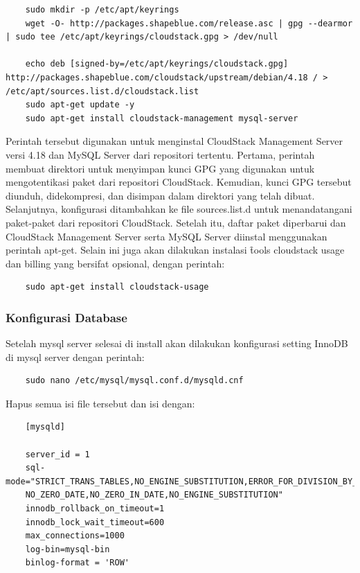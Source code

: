 \begin{listing}[H]
    \begin{verbatim}
    sudo mkdir -p /etc/apt/keyrings
    wget -O- http://packages.shapeblue.com/release.asc | gpg --dearmor | sudo tee /etc/apt/keyrings/cloudstack.gpg > /dev/null

    echo deb [signed-by=/etc/apt/keyrings/cloudstack.gpg] http://packages.shapeblue.com/cloudstack/upstream/debian/4.18 / > /etc/apt/sources.list.d/cloudstack.list
    sudo apt-get update -y
    sudo apt-get install cloudstack-management mysql-server
    \end{verbatim}
\end{listing}

Perintah tersebut digunakan untuk menginstal CloudStack Management Server versi 4.18 dan MySQL Server dari repositori tertentu. Pertama, perintah membuat direktori untuk menyimpan kunci GPG yang digunakan untuk mengotentikasi paket dari repositori CloudStack. Kemudian, kunci GPG tersebut diunduh, didekompresi, dan disimpan dalam direktori yang telah dibuat. Selanjutnya, konfigurasi ditambahkan ke file sources.list.d untuk menandatangani paket-paket dari repositori CloudStack. Setelah itu, daftar paket diperbarui dan CloudStack Management Server serta MySQL Server diinstal menggunakan perintah apt-get. Selain ini juga akan dilakukan instalasi \f{tools} cloudstack usage dan billing yang bersifat opsional, dengan perintah:

\begin{verbatim}
    sudo apt-get install cloudstack-usage
\end{verbatim}

\subsubsection{Konfigurasi Database}
Setelah mysql server selesai di install akan dilakukan konfigurasi setting InnoDB di mysql server dengan perintah:

\begin{verbatim}
    sudo nano /etc/mysql/mysql.conf.d/mysqld.cnf
\end{verbatim}

Hapus semua isi file tersebut dan isi dengan:

\begin{listing}[H]
    \begin{verbatim}
    [mysqld]

    server_id = 1
    sql-mode="STRICT_TRANS_TABLES,NO_ENGINE_SUBSTITUTION,ERROR_FOR_DIVISION_BY_ZERO
    NO_ZERO_DATE,NO_ZERO_IN_DATE,NO_ENGINE_SUBSTITUTION"
    innodb_rollback_on_timeout=1
    innodb_lock_wait_timeout=600
    max_connections=1000
    log-bin=mysql-bin
    binlog-format = 'ROW'
    \end{verbatim}
    \caption{Konfigurasi mysqld.cnf}
    \label{code:mysql_config}
\end{listing}

